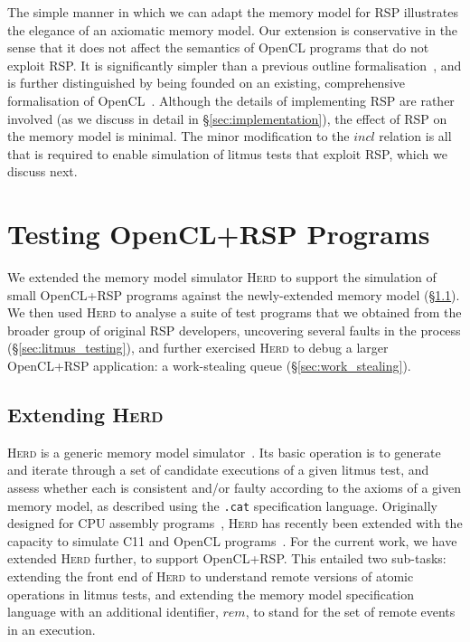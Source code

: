\documentclass[svgnames,10pt]{sigplanconf}
\theoremstyle{definition}
\newcommand\var[1]{\mathit{#1}}
\newcommand\herd{\textsc{Herd}}
\newcommand\Herd{\textsc{Herd}}
\newcommand\cat{\texttt{.cat}}
\begin{document}
The simple manner in which we can adapt the memory model for RSP
illustrates the elegance of an axiomatic memory model. Our extension
is conservative in the sense that it does not affect the semantics of
OpenCL programs that do not exploit RSP. It is significantly simpler
than a previous outline formalisation~\cite{orr+15}, and is further distinguished by being
founded on an existing, comprehensive
formalisation of OpenCL~\cite{wickerson+15}. Although the details of
implementing RSP are rather involved (as we discuss in detail in
\S\ref{sec:implementation}), the effect of RSP on the memory model is
minimal. The minor modification to the $\var{incl}$ relation is all
that is required to enable simulation of litmus tests that exploit
RSP, which we discuss next.

\section{Testing OpenCL+RSP Programs}
\label{sec:testing}

We extended the memory model simulator \herd{} to support the
simulation of small OpenCL+RSP programs against the newly-extended
memory model (\S\ref{sec:extending_herd}). We then used
\herd{} to analyse a suite of test
programs that we obtained from the broader group of original RSP developers, uncovering
several faults in the process (\S\ref{sec:litmus_testing}), and
further exercised \herd{} to debug a larger OpenCL+RSP
application: a work-stealing queue (\S\ref{sec:work_stealing}).

\subsection{Extending \herd{}}
\label{sec:extending_herd} 

\Herd{} is a generic memory model simulator~\cite{alglave+14}. Its
basic operation is to generate and iterate through a set of candidate
executions of a given litmus test, and assess whether each is
consistent and/or faulty according to the axioms of a given memory
model, as described using the \cat{} specification language.
Originally designed for CPU assembly programs~\cite{alglave+14},
\herd{} has recently been extended with the capacity to simulate C11
and OpenCL programs~\cite{wickerson+15}. For the current work, we have
extended \herd{} further, to support OpenCL+RSP. This entailed two
sub-tasks: extending the front end of \herd{} to understand remote
versions of atomic operations in litmus tests, and extending the
memory model specification language with an additional identifier,
$\var{rem}$, to stand for the set of remote events in an execution.
\end{document}
